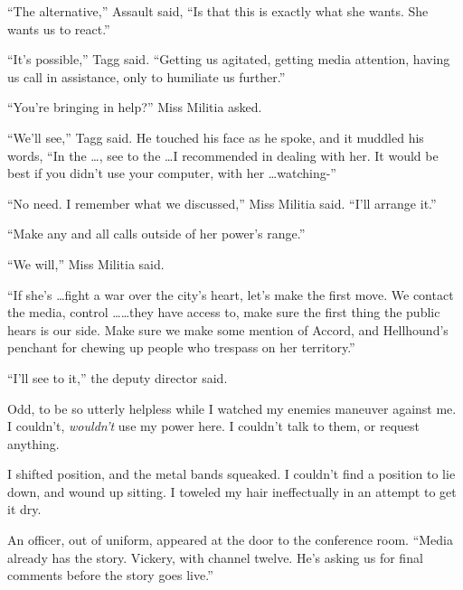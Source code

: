 ``The alternative,'' Assault said, ``Is that this is exactly what she wants.  She wants us to react.''



``It's possible,'' Tagg said.  ``Getting us agitated, getting media attention, having us call in assistance, only to humiliate us further.''



``You're bringing in help?'' Miss Militia asked.



``We'll see,'' Tagg said.  He touched his face as he spoke, and it muddled his words, ``In the \ldots, see to the \ldots I recommended in dealing with her.  It would be best if you didn't use your computer, with her \ldots watching-''



``No need.  I remember what we discussed,'' Miss Militia said.  ``I'll arrange it.''



``Make any and all calls outside of her power's range.''



``We will,'' Miss Militia said.



``If she's \ldots fight a war over the city's heart, let's make the first move.  We contact the media, control \ldots \ldots they have access to, make sure the first thing the public hears is our side.  Make sure we make some mention of Accord, and Hellhound's penchant for chewing up people who trespass on her territory.''



``I'll see to it,'' the deputy director said.



Odd, to be so utterly helpless while I watched my enemies maneuver against me.  I couldn't, \emph{wouldn't} use my power here.  I couldn't talk to them, or request anything.



I shifted position, and the metal bands squeaked.  I couldn't find a position to lie down, and wound up sitting.  I toweled my hair ineffectually in an attempt to get it dry.



An officer, out of uniform, appeared at the door to the conference room.  ``Media already has the story.  Vickery, with channel twelve.  He's asking us for final comments before the story goes live.''



